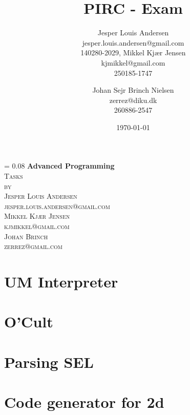 \documentclass[a4paper, oneside, 10pt, draft]{memoir}
\author{Jesper Louis
  Andersen\\jesper.louis.andersen@gmail.com\\140280-2029,
  Mikkel Kj\ae r Jensen \\ kjmikkel@gmail.com\\250185-1747 \and
  Johan Sejr Brinch Nielsen \\ zerrez@diku.dk \\ 260886-2547
}
\title{PIRC - Exam}
\date{\today}
\makeatletter
\renewcommand*{\titleM}{\begingroup%
  \drop = 0.08\textheight
  \centering
  {\Huge\bfseries Advanced Programming}\\[\baselineskip]
  {\scshape Tasks}\\[\baselineskip]
  {\scshape by}\\[\baselineskip]
  {\large\scshape Jesper Louis Andersen\\jesper.louis.andersen@gmail.com}\\[\baselineskip]
  {\large\scshape Mikkel Kj\ae r Jensen\\kjmikkel@gmail.com}\\[\baselineskip]
  {\large\scshape Johan Brinch\\zerrez@gmail.com}\\[\baselineskip]
  \endgroup}
\newcommand{\hide}[1]{}
\makeatother
\begin{document}
\titleM
\listoffixmes
\tableofcontents

\chapter{UM Interpreter}
\label{chap:task+1}

\chapter{O'Cult}
\label{chap:ocult}

\chapter{Parsing SEL}


\chapter{Code generator for 2d}
\label{compiler}








\appendix
\hide{
\clearpage
\section{Source}

\clearpage

\clearpage

\clearpage

\clearpage

\clearpage
\section{Twelf}
\label{appendix:twelf}

\clearpage

\clearpage

\clearpage
\section{2d multiplication}

}
\end{document}
